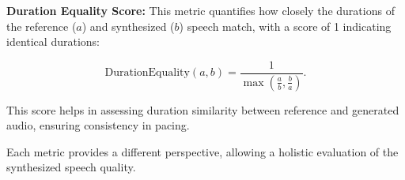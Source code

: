 \label{sec:DurationEquality}
\noindent \textbf{Duration Equality Score:} This metric quantifies how closely the durations of the reference ($a$) and synthesized ($b$) speech match, with a score of 1 indicating identical durations:

\[
\text{DurationEquality}(a, b) = \frac{1}{\max\left(\frac{a}{b}, \frac{b}{a}\right)}.
\]

This score helps in assessing duration similarity between reference and generated audio, ensuring consistency in pacing.

Each metric provides a different perspective, allowing a holistic evaluation of the synthesized speech quality.








